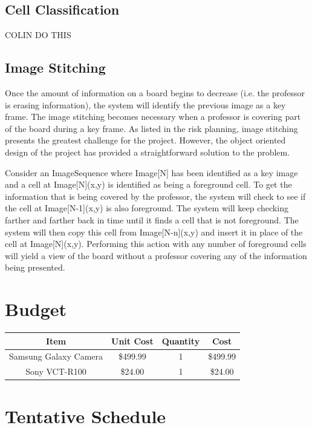 \documentclass[]{article}
\begin{document}
		\subsection{Cell Classification}
			COLIN DO THIS
			
		\subsection{Image Stitching}
			Once the amount of information on a board begins to decrease (i.e. the professor is erasing information), the system will identify the previous image as a key frame. The image stitching becomes necessary when a professor is covering part of the board during a key frame. As listed in the risk planning, image stitching presents the greatest challenge for the project. However, the object oriented design of the project has provided a straightforward solution to the problem. 
			
			Consider an ImageSequence where Image[N] has been identified as a key image and a cell at Image[N](x,y) is identified as being a foreground cell. To get the information that is being covered by the professor, the system will check to see if the cell at Image[N-1](x,y) is also foreground. The system will keep checking farther and farther back in time until it finds a cell that is not foreground. The system will then copy this cell from Image[N-n](x,y) and insert it in place of the cell at Image[N](x,y). Performing this action with any number of foreground cells will yield a view of the board without a professor covering any of the information being presented.
	
	\section{Budget}
	
		\begin{tabular}{| c | c | c | c |}
			\hline
			Item						&	Unit Cost		&	Quantity		&	Cost		\\
			\hline
			Samsung Galaxy Camera	&	\$499.99		&	1			&	\$499.99	\\
			\hline
			Sony VCT-R100			&	\$24.00		&	1			&	\$24.00 \\
			\hline
			
		
		\end{tabular}
	
	
	\section{Tentative Schedule}
		
		
		
			
\end{document}
